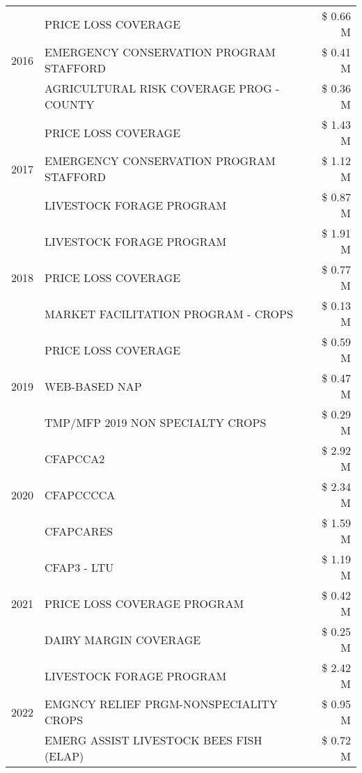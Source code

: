 \begin{tabular}{llr}
\cline{1-3}
\multirow[t]{3}{*}{2016} & PRICE LOSS COVERAGE & \$ 0.66 M \\
 & EMERGENCY CONSERVATION PROGRAM STAFFORD & \$ 0.41 M \\
 & AGRICULTURAL RISK COVERAGE PROG - COUNTY & \$ 0.36 M \\
\cline{1-3}
\multirow[t]{3}{*}{2017} & PRICE LOSS COVERAGE & \$ 1.43 M \\
 & EMERGENCY CONSERVATION PROGRAM STAFFORD & \$ 1.12 M \\
 & LIVESTOCK FORAGE PROGRAM & \$ 0.87 M \\
\cline{1-3}
\multirow[t]{3}{*}{2018} & LIVESTOCK FORAGE PROGRAM & \$ 1.91 M \\
 & PRICE LOSS COVERAGE & \$ 0.77 M \\
 & MARKET FACILITATION PROGRAM - CROPS & \$ 0.13 M \\
\cline{1-3}
\multirow[t]{3}{*}{2019} & PRICE LOSS COVERAGE & \$ 0.59 M \\
 & WEB-BASED NAP & \$ 0.47 M \\
 & TMP/MFP 2019 NON SPECIALTY CROPS & \$ 0.29 M \\
\cline{1-3}
\multirow[t]{3}{*}{2020} & CFAPCCA2 & \$ 2.92 M \\
 & CFAPCCCCA & \$ 2.34 M \\
 & CFAPCARES & \$ 1.59 M \\
\cline{1-3}
\multirow[t]{3}{*}{2021} & CFAP3 - LTU & \$ 1.19 M \\
 & PRICE LOSS COVERAGE PROGRAM & \$ 0.42 M \\
 & DAIRY MARGIN COVERAGE & \$ 0.25 M \\
\cline{1-3}
\multirow[t]{3}{*}{2022} & LIVESTOCK FORAGE PROGRAM & \$ 2.42 M \\
 & EMGNCY RELIEF PRGM-NONSPECIALITY CROPS & \$ 0.95 M \\
 & EMERG ASSIST LIVESTOCK BEES FISH (ELAP) & \$ 0.72 M \\
\cline{1-3}
\bottomrule
\end{tabular}
